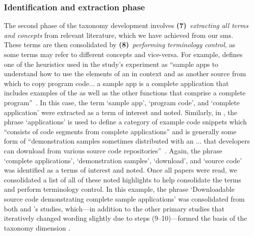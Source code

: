 \subsubsection{Identification and extraction phase} The second phase of the taxonomy development involves \textbf{(7)}~\textit{extracting all terms and concepts} from relevant literature, which we have achieved from our \gls{sms}. These terms are then consolidated by \textbf{(8)}~\textit{performing terminology control}, as some terms may refer to different concepts and vice-versa. For example, \citeauthor{Watson:2012uy} defines one of the heuristics used in the study's experiment as ``sample apps to understand how to use the elements of an  in context and as another source from which to copy program code... a sample app is a complete application that includes examples of the  as well as the other functions that comprise a complete program''~\citep{Watson:2012uy}. In this case, the term `sample app', `program code', and `complete application' were extracted as a term of interest and noted. Similarly, in \citet{Robillard:2009uk}, the phrase `applications' is used to define a category of example code snippets which ``consists of code segments from complete applications'' and is generally some form of ``demonstration samples sometimes distributed with an ... that developers can download from various source code repositories''~\citep{Robillard:2009uk}. Again, the phrase `complete applications', `demonstration samples', `download', and `source code' was identified as a terms of interest and noted. Once all papers were read, we consolidated a list of all of these noted highlights to help consolidate the terms and perform terminology control. In this example, the phrase `Downloadable source code demonstrating complete sample applications' was consolidated from both \citeauthor{Watson:2012uy} and \citeauthor{Robillard:2009uk}'s studies, which---in addition to the other primary studies that iteratively changed wording slightly due to steps (9--10)---formed the basis of the taxonomy dimension .

